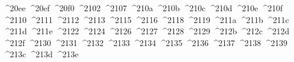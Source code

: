 {  ^^^^20ee%
  ^^^^20ef%
  ^^^^20f0%
  ^^^^2102%
  ^^^^2107%
  ^^^^210a%
  ^^^^210b%
  ^^^^210c%
  ^^^^210d%
  ^^^^210e%
  ^^^^210f%
  ^^^^2110%
  ^^^^2111%
  ^^^^2112%
  ^^^^2113%
  ^^^^2115%
  ^^^^2116%
  ^^^^2118%
  ^^^^2119%
  ^^^^211a%
  ^^^^211b%
  ^^^^211c%
  ^^^^211d%
  ^^^^211e%
  ^^^^2122%
  ^^^^2124%
  ^^^^2126%
  ^^^^2127%
  ^^^^2128%
  ^^^^2129%
  ^^^^212b%
  ^^^^212c%
  ^^^^212d%
  ^^^^212f%
  ^^^^2130%
  ^^^^2131%
  ^^^^2132%
  ^^^^2133%
  ^^^^2134%
  ^^^^2135%
  ^^^^2136%
  ^^^^2137%
  ^^^^2138%
  ^^^^2139%
  ^^^^213c%
  ^^^^213d%
  ^^^^213e%
}
